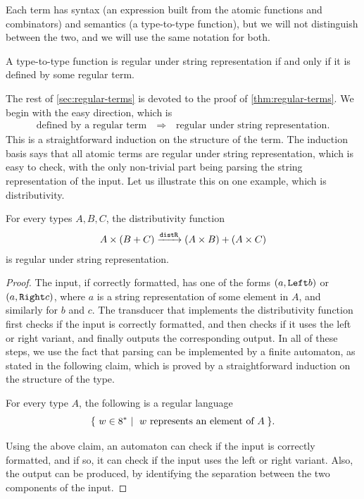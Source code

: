 Each term has syntax (an expression built from the atomic functions and combinators) and semantics (a type-to-type function), but we will not distinguish between the two, and we will use the same notation for both. 

\begin{theorem}\label{thm:regular-terms} A type-to-type function is regular under string representation if and only if it is defined by some regular term.
\end{theorem}

The rest of \cref{sec:regular-terms} is devoted to the proof of \cref{thm:regular-terms}.  We begin with the easy direction, which is
\begin{align*}
\text{defined by a regular term} 
\quad \Rightarrow \quad 
\text{regular under string representation.}
\end{align*}
This is a straightforward induction on the structure of the term. The induction basis says that all atomic terms are regular under string representation, which is easy to check, with the only  non-trivial part being  parsing the string representation of the input. Let us illustrate this on one example, which is distributivity.

\begin{lemma}\label{lem:distributivity-is-regular-under-string-representation}
    For every types $A,B,C$, the distributivity function
    \begin{align*}
    A \times (B + C) \xrightarrow {\mathtt{distR}} (A \times B) + (A \times C)
    \end{align*}
    is regular under string representation.
\end{lemma}
\begin{proof}
    The input, if correctly formatted, has one of the forms $(a, \mathtt{Left} b)$ or $(a, \mathtt{Right} c)$, where $a$ is a string representation of some element in $A$, and similarly for $b$ and $c$.      The transducer that implements the distributivity function first checks if the input is correctly formatted, and then checks if it uses the left or right variant, and finally outputs the corresponding output. In all of these steps, we use the fact that parsing can be implemented by a finite automaton, as stated in the following claim, which is proved by a straightforward induction on the structure of the type. 
        \begin{claim}\label{claim:parsing-is-regular}
        For every type $A$, the following is a regular language
        \begin{align*}
        \setbuild{ w \in 8^*}{$w$ represents an element of $A$}.
        \end{align*}
    \end{claim}
    Using the above claim, an automaton can check if the input is correctly formatted, and if so, it can check if the input uses the left or right variant. Also, the output can be produced, by identifying the separation between the two components of the input. 
\end{proof}

